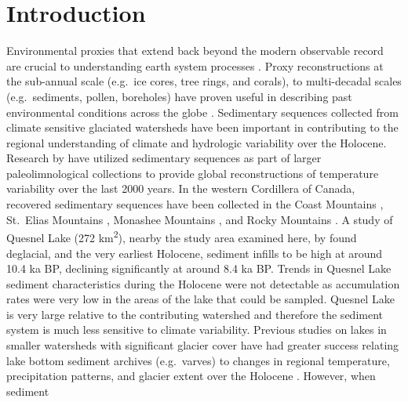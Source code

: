 \documentclass[Royal,times,doublespace,sageh]{sagej}
\begin{document}

\maketitle

\hypertarget{introduction}{%
\section{Introduction}\label{introduction}}

Environmental proxies that extend back beyond the modern observable
record are crucial to understanding earth system processes
\citep{Turney2019, Huber2012, Nelson2016}. Proxy reconstructions at the
sub-annual scale (e.g.~ice cores, tree rings, and corals), to
multi-decadal scales (e.g.~sediments, pollen, boreholes) have proven
useful in describing past environmental conditions across the globe
\citep{Masson2013}. Sedimentary sequences collected from climate
sensitive glaciated watersheds have been important in contributing to
the regional understanding of climate and hydrologic variability over
the Holocene. Research by \citet{Neukom2019} have utilized sedimentary
sequences as part of larger paleolimnological collections to provide
global reconstructions of temperature variability over the last 2000
years. In the western Cordillera of Canada, recovered sedimentary
sequences have been collected in the Coast Mountains
\citep{Menounos2008}, St.~Elias Mountains \citep{Crookshanks2008},
Monashee Mountains \citep{Hodder2006}, and Rocky Mountains
\citep{Leonard1986, Dirszowsky1997a, Desloges1999}. A study of Quesnel
Lake (272 km\textsuperscript{2}), nearby the study area examined here,
by \citet{Gilbert2012} found deglacial, and the very earliest Holocene,
sediment infills to be high at around 10.4 ka BP, declining
significantly at around 8.4 ka BP. Trends in Quesnel Lake sediment
characteristics during the Holocene were not detectable as accumulation
rates were very low in the areas of the lake that could be sampled.
Quesnel Lake is very large relative to the contributing watershed and
therefore the sediment system is much less sensitive to climate
variability. Previous studies on lakes in smaller watersheds with
significant glacier cover have had greater success relating lake bottom
sediment archives (e.g.~varves) to changes in regional temperature,
precipitation patterns, and glacier extent over the Holocene
\citep{Desloges1999, Hodder2006, Menounos2006b}. However, when sediment
\end{document}
